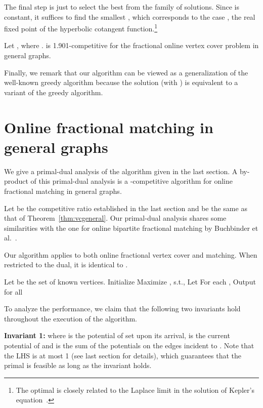 \documentclass{article}
\begin{document}
The final step is just to select the best  from the family of solutions. Since  is constant, it suffices to find the smallest , which corresponds to the case , the real fixed point of the hyperbolic cotangent function.\footnote{The optimal  is closely related to the Laplace limit in the solution of Kepler's equation~\cite{weisstein}.}

\begin{theorem}
\label{thm:vcgeneral}
Let , where .  is 1.901-competitive for the fractional online vertex cover problem in general graphs.
\end{theorem}

Finally, we remark that our algorithm can be viewed as a generalization of the well-known greedy algorithm because the solution  (with ) is equivalent to a variant of the greedy algorithm.

\section{Online fractional matching in general graphs}
We give a primal-dual analysis of the algorithm given in the last section. 
A by-product of this primal-dual analysis is a -competitive algorithm for online fractional matching in general graphs.

Let  be the competitive ratio established in the last section and  be the same as that of Theorem~\ref{thm:vcgeneral}. Our primal-dual analysis shares some similarities with the one for online bipartite fractional matching by Buchbinder et al.~\cite{Buchbinder2007}.


Our algorithm  applies to both online fractional vertex cover and matching.  When restricted to the dual, it is identical to . 

\begin{algorithm}[h!]
\SetAlgoLined
\caption{}
\label{alg:general greedy}
Let  be the set of known vertices. Initialize \;
{
Maximize , s.t., \;
Let \;
{
\;
\;
}
For each , \;
\;
\;
}
Output  for all \;
\end{algorithm}

To analyze the performance, we claim that the following two invariants hold throughout the execution of the algorithm.

\textbf{Invariant 1:}  where  is the potential of  set upon its arrival,  is the current potential of  and  is the sum of the potentials on the edges incident to . Note that the LHS is at most 1 (see last section for details), which guarantees that the primal is feasible as long as the invariant holds.
\end{document}
